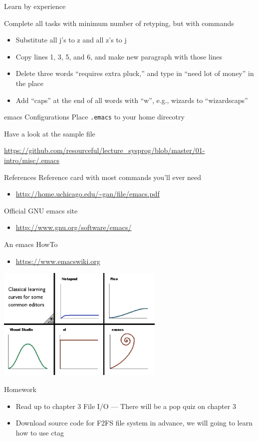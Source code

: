 \documentclass[newPxFont,sthlmFooter,nooffset]{beamer}
\begin{document}
\begin{frame}[containsverbatim,t]{Learn by experience}




Complete all tasks with minimum number of retyping, but with commands
\begin{itemize}
\item Substitute all j's to z and all z's to j
\item Copy lines 1, 3, 5, and 6, and make new paragraph with those lines
\item Delete three words ``requires extra pluck,'' and type in ``need lot of money'' in the place
\item Add ``caps'' at the end of all words with ``w'', e.g., wizards to ``wizardscaps''
\end{itemize}


\end{frame}

\begin{frame}[t]{emacs Configurations}
Place \texttt{.emacs} to your home direcotry

\bigskip
Have a look at the sample file

\url{https://github.com/resourceful/lecture_sysprog/blob/master/01-intro/misc/.emacs}
\end{frame}


\begin{frame}[t]{References}
Reference card with most commands you’ll ever need
\begin{itemize}
\item \url{http://home.uchicago.edu/~gan/file/emacs.pdf}
\end{itemize}
\bigskip
Official GNU emacs site
\begin{itemize}
\item \url{http://www.gnu.org/software/emacs/}
\end{itemize}

\bigskip
An emacs HowTo
\begin{itemize}
\item \url{https://www.emacswiki.org}
\end{itemize}
\vspace{-2em}
\hfill
\includegraphics[width=0.6\textwidth]{./figure/learning_curve.png}
\end{frame}


\begin{frame}[t]{Homework}
\begin{itemize}
\item Read up to chapter 3 File I/O --- There will be a pop quiz on chapter 3
\item Download source code for F2FS file system in advance, we will going to learn how to use ctag 
\end{itemize}
\end{frame}
\end{document}
